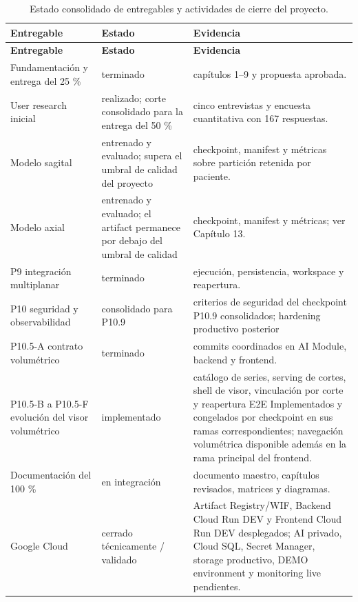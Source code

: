 \begingroup
\scriptsize
\setlength{\tabcolsep}{3pt}
\renewcommand{\arraystretch}{1.18}
\begin{longtable}{|p{}|p{}|p{}|}
\caption{Estado consolidado de entregables y actividades de cierre del proyecto.}\label{tab:plan-roadmap-50}\\
\hline
\textbf{Entregable} & \textbf{Estado} & \textbf{Evidencia} \\
\hline
\endfirsthead
\hline
\textbf{Entregable} & \textbf{Estado} & \textbf{Evidencia} \\
\hline
\endhead
Fundamentación y entrega del 25 \% & terminado & capítulos 1–9 y propuesta aprobada. \\
\hline
User research inicial & realizado; corte consolidado para la entrega del 50 \% & cinco entrevistas y encuesta cuantitativa con 167 respuestas. \\
\hline
Modelo sagital & entrenado y evaluado; supera el umbral de calidad del proyecto & checkpoint, manifest y métricas sobre partición retenida por paciente. \\
\hline
Modelo axial & entrenado y evaluado; el artifact permanece por debajo del umbral de calidad & checkpoint, manifest y métricas; ver Capítulo 13. \\
\hline
P9 integración multiplanar & terminado & ejecución, persistencia, workspace y reapertura. \\
\hline
P10 seguridad y observabilidad & consolidado para P10.9 & criterios de seguridad del checkpoint P10.9 consolidados; hardening productivo posterior \\
\hline
P10.5-A contrato volumétrico & terminado & commits coordinados en AI Module, backend y frontend. \\
\hline
P10.5-B a P10.5-F evolución del visor volumétrico & implementado & catálogo de series, serving de cortes, shell de visor, vinculación por corte y reapertura E2E Implementados y congelados por checkpoint en sus ramas correspondientes; navegación volumétrica disponible además en la rama principal del frontend. \\
\hline
Documentación del 100 \% & en integración & documento maestro, capítulos revisados, matrices y diagramas. \\
\hline
Google Cloud & cerrado técnicamente / validado & Artifact Registry/WIF, Backend Cloud Run DEV y Frontend Cloud Run DEV desplegados; AI privado, Cloud SQL, Secret Manager, storage productivo, DEMO environment y monitoring live pendientes. \\

\end{longtable}
